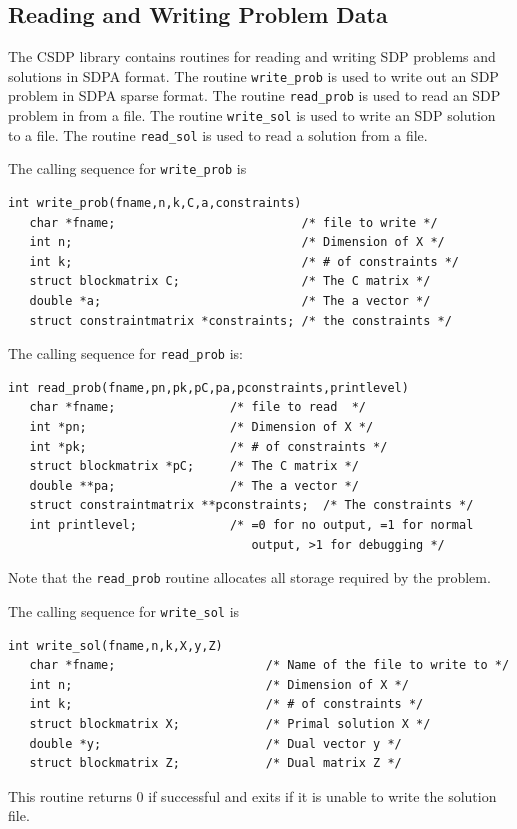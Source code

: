 \documentclass{article}
\begin{document}
\subsection*{Reading and Writing Problem Data}
The CSDP library contains routines for reading and writing SDP
problems and solutions in SDPA format. The routine {\tt write\_prob}
is used to write out an SDP problem in SDPA sparse format.  The
routine {\tt read\_prob} is used to read an SDP problem in from a
file.  The routine {\tt write\_sol} is used to write an SDP solution
to a file.  The routine {\tt read\_sol} is used to read a solution
from a file.

The calling sequence for {\tt write\_prob} is 

\begin{verbatim}
int write_prob(fname,n,k,C,a,constraints)
   char *fname;                          /* file to write */
   int n;                                /* Dimension of X */
   int k;                                /* # of constraints */
   struct blockmatrix C;                 /* The C matrix */
   double *a;                            /* The a vector */
   struct constraintmatrix *constraints; /* the constraints */
\end{verbatim}

The calling sequence for {\tt read\_prob} is:

\begin{verbatim} 
int read_prob(fname,pn,pk,pC,pa,pconstraints,printlevel)
   char *fname;                /* file to read  */
   int *pn;                    /* Dimension of X */
   int *pk;                    /* # of constraints */
   struct blockmatrix *pC;     /* The C matrix */
   double **pa;                /* The a vector */
   struct constraintmatrix **pconstraints;  /* The constraints */
   int printlevel;             /* =0 for no output, =1 for normal
                                  output, >1 for debugging */
\end{verbatim}
Note that the {\tt read\_prob} routine allocates all storage required
by the problem.  
 
The calling sequence for {\tt write\_sol} is 

\begin{verbatim}
int write_sol(fname,n,k,X,y,Z)
   char *fname;                     /* Name of the file to write to */
   int n;                           /* Dimension of X */
   int k;                           /* # of constraints */
   struct blockmatrix X;            /* Primal solution X */
   double *y;                       /* Dual vector y */
   struct blockmatrix Z;            /* Dual matrix Z */
\end{verbatim}
This routine returns 0 if successful and exits if it is unable to write
the solution file.  
\end{document}
